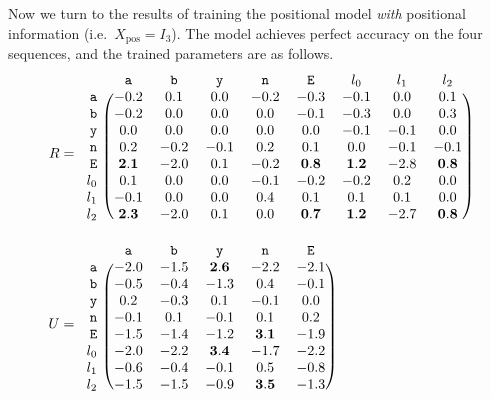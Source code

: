 \documentclass{article}
\newcommand{\ta}{\mathtt{a}}
\newcommand{\tb}{\mathtt{b}}
\newcommand{\tn}{\mathtt{n}}
\newcommand{\ty}{\mathtt{y}}
\newcommand{\tE}{\mathtt{E}}
\begin{document}
Now we turn to the results of training the positional model
\emph{with} positional information (i.e.\ $X_\text{pos}=I_3$). The
model achieves perfect accuracy on the four sequences, and the trained
parameters are as follows.
\begin{displaymath}
  \begin{aligned}
  R &=
  \begin{blockarray}{ccccccccc}
       & \ta & \tb & \ty & \tn & \tE & l_0 & l_1 & l_2 \\
      \begin{block}{r(cccccccc)}
        \ta & -0.2 & 0.1 & 0.0 & -0.2 & -0.3 & -0.1 & 0.0 & 0.1 \\
        \tb & -0.2 & 0.0 & 0.0 & 0.0 & -0.1 & -0.3 & 0.0 & 0.3 \\
        \ty & 0.0 & 0.0 & 0.0 & 0.0 & 0.0 & -0.1 & -0.1 & 0.0 \\
        \tn & 0.2 & -0.2 & -0.1 & 0.2 & 0.1 & 0.0 & -0.1 & -0.1 \\
        \tE & \mathbf{2.1} & -2.0 & 0.1 & -0.2 & \mathbf{0.8} & \mathbf{1.2} & -2.8 & \mathbf{0.8} \\
        l_0 & 0.1 & 0.0 & 0.0 & -0.1 & -0.2 & -0.2 & 0.2 & 0.0  \\
        l_1 & -0.1 & 0.0 & 0.0 & 0.4 & 0.1 & 0.1 & 0.1 & 0.0 & \\
        l_2 & \mathbf{2.3} & -2.0 & 0.1 & 0.0 & \mathbf{0.7} & \mathbf{1.2} & -2.7 & \mathbf{0.8} \\
      \end{block}
    \end{blockarray} \\
    U &=
  \begin{blockarray}{ccccccccc}
       & \ta & \tb & \ty & \tn & \tE \\
      \begin{block}{r(cccccccc)}
        \ta & -2.0 & -1.5 & \mathbf{2.6} & -2.2 & -2.1 \\
        \tb & -0.5 & -0.4 & -1.3 & 0.4 & -0.1 \\
        \ty & 0.2 & -0.3 & 0.1 & -0.1 & 0.0 \\
        \tn & -0.1 & 0.1 & -0.1 & 0.1 & 0.2 \\
        \tE & -1.5 & -1.4 & -1.2 & \mathbf{3.1} & -1.9 \\
        l_0 & -2.0 & -2.2 & \mathbf{3.4} & -1.7 & -2.2 \\
        l_1 & -0.6 & -0.4 & -0.1 & 0.5 & -0.8 \\
        l_2 & -1.5 & -1.5 & -0.9 & \mathbf{3.5} & -1.3 \\
      \end{block}
    \end{blockarray} \\    
  \end{aligned}
\end{displaymath}
\end{document}
